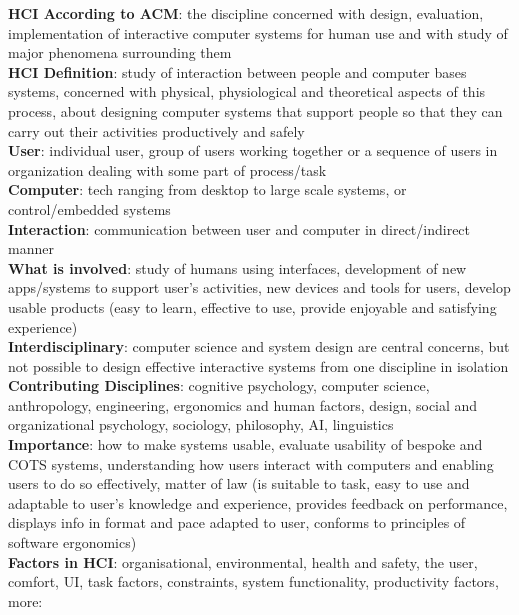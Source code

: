 \documentclass[a4paper]{article}
\begin{document}
    \scriptsize
    \begin{multicols}{2}
        \noindent\textbf{HCI According to ACM}: the discipline concerned with design, evaluation, implementation of interactive computer systems for human use and with study of major phenomena surrounding them\\
        \textbf{HCI Definition}: study of interaction between people and computer bases systems, concerned with physical, physiological and theoretical aspects of this process, about designing computer systems that support people so that they can carry out their activities productively and safely\\
        \textbf{User}: individual user, group of users working together or a sequence of users in organization dealing with some part of process/task\\
        \textbf{Computer}: tech ranging from desktop to large scale systems, or control/embedded systems\\
        \textbf{Interaction}: communication between user and computer in direct/indirect manner\\
        \textbf{What is involved}: study of humans using interfaces, development of new apps/systems to support user's activities, new devices and tools for users, develop usable products (easy to learn, effective to use, provide enjoyable and satisfying experience)\\
        \textbf{Interdisciplinary}: computer science and system design are central concerns, but not possible to design effective interactive systems from one discipline in isolation\\
        \textbf{Contributing Disciplines}: cognitive psychology, computer science, anthropology, engineering, ergonomics and human factors, design, social and organizational psychology, sociology, philosophy, AI, linguistics\\
        \textbf{Importance}: how to make systems usable, evaluate usability of bespoke and COTS systems, understanding how users interact with computers and enabling users to do so effectively, matter of law (is suitable to task, easy to use and adaptable to user's knowledge and experience, provides feedback on performance, displays info in format and pace adapted to user, conforms to principles of software ergonomics)\\
        \textbf{Factors in HCI}: organisational, environmental, health and safety, the user, comfort, UI, task factors, constraints, system functionality, productivity factors, more:\\

\end{multicols}
\end{document}

